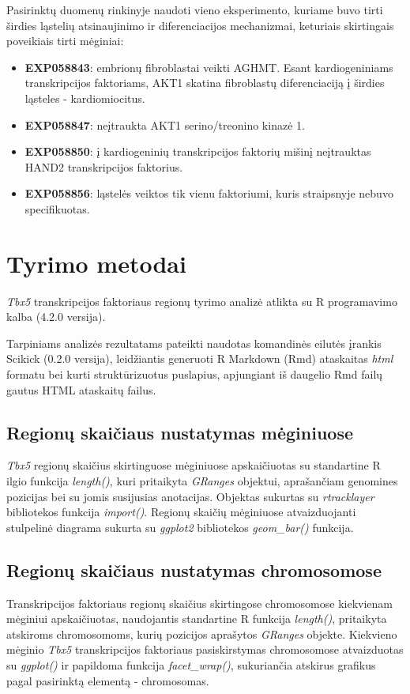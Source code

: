 \documentclass[12pt]{article}
\begin{document}
Pasirinktų duomenų rinkinyje naudoti vieno eksperimento, kuriame buvo
tirti širdies ląstelių atsinaujinimo ir diferenciacijos mechanizmai,
keturiais skirtingais poveikiais tirti mėginiai:

\begin{itemize}
    \item \textbf{EXP058843}: embrionų fibroblastai veikti AGHMT. Esant
        kardiogeniniams transkripcijos faktoriams, AKT1 skatina fibroblastų
        diferenciaciją į širdies ląsteles - kardiomiocitus.
    \item \textbf{EXP058847}: neįtraukta AKT1 serino/treonino kinazė 1.
    \item \textbf{EXP058850}: į kardiogeninių transkripcijos faktorių mišinį
        neįtrauktas HAND2 transkripcijos faktorius.
    \item \textbf{EXP058856}: ląstelės veiktos tik vienu faktoriumi, kuris
        straipsnyje nebuvo specifikuotas.
  \end{itemize}
\newpage


\section{Tyrimo metodai}
\emph{Tbx5} transkripcijos faktoriaus regionų tyrimo analizė atlikta
su R programavimo kalba\cite{R} (4.2.0 versija).

Tarpiniams analizės rezultatams pateikti naudotas komandinės eilutės
įrankis Scikick\cite{SCIK} (0.2.0 versija), leidžiantis generuoti
R Markdown (Rmd) ataskaitas \emph{html} formatu bei kurti
struktūrizuotus puslapius, apjungiant iš daugelio Rmd failų
gautus HTML ataskaitų failus.

\subsection{Regionų skaičiaus nustatymas mėginiuose}
\emph{Tbx5} regionų skaičius skirtinguose mėginiuose apskaičiuotas
su standartine R ilgio funkcija \emph{length()}, kuri pritaikyta
\emph{GRanges} objektui, aprašančiam genomines pozicijas bei su jomis
susijusias anotacijas. Objektas sukurtas su \emph{rtracklayer}\cite{R_TRACK}
bibliotekos funkcija \emph{import()}.
Regionų skaičių mėginiuose atvaizduojanti stulpelinė diagrama
sukurta su \emph{ggplot2}\cite{R_GGPLOT} bibliotekos
\emph{geom\_bar()} funkcija.

\subsection{Regionų skaičiaus nustatymas chromosomose}
Transkripcijos faktoriaus regionų skaičius skirtingose chromosomose
kiekvienam mėginiui apskaičiuotas, naudojantis standartine R
funkcija \emph{length()}, pritaikyta atskiroms chromosomoms,
kurių pozicijos aprašytos \emph{GRanges} objekte.
Kiekvieno mėginio \emph{Tbx5} transkripcijos faktoriaus pasiskirstymas
chromosomose atvaizduotas su \emph{ggplot()} ir papildoma funkcija
\emph{facet\_wrap()}, sukuriančia atskirus grafikus pagal pasirinktą
elementą - chromosomas.
\end{document}
